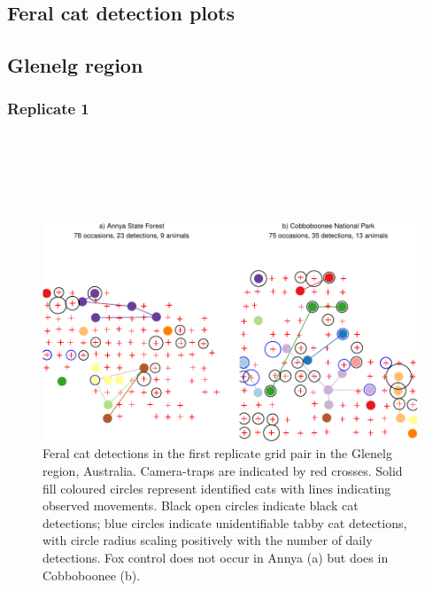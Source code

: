 \documentclass[11pt,a4paper,titlepage,twoside,openright]{style/unimelbthesis}
\begin{document}
\begin{mainmatter}
\newpage

\hypertarget{feral-cat-detection-plots}{%
\section{Feral cat detection plots}\label{feral-cat-detection-plots}}

\hypertarget{glenelg-region}{%
\subsection{Glenelg region}\label{glenelg-region}}

\hypertarget{replicate-1}{%
\subsubsection{Replicate 1}\label{replicate-1}}

\(~\)

\(~\)

\(~\)
\begin{figure}

{\centering \includegraphics[width=1\linewidth]{figure/density-plot-ch-1-1} 

}

\caption{Feral cat detections in the first replicate grid pair in the Glenelg region, Australia. Camera-traps are indicated by red crosses. Solid fill coloured circles represent identified cats with lines indicating observed movements. Black open circles indicate black cat detections; blue circles indicate unidentifiable tabby cat detections, with circle radius scaling positively with the number of daily detections. Fox control does not occur in Annya (a) but does in Cobboboonee (b).}\label{fig:density-plot-ch-1}
\end{figure}
\newpage


\end{mainmatter}
\end{document}
